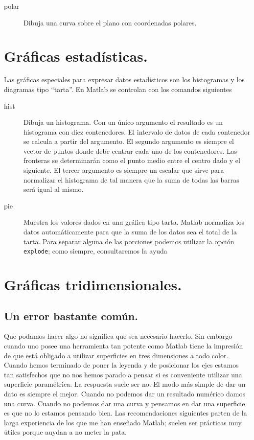 \begin{description}
\item [polar\texttt{}]Dibuja una curva sobre el plano con
coordenadas polares.
\end{description}

\section{Gráficas estadísticas.}

Las gráficas especiales para expresar datos estadísticos son los histogramas
y los diagramas tipo {}``tarta''. En Matlab se controlan con los
comandos siguientes

\begin{description}
\item [hist\texttt{}]Dibuja un histograma. Con un único argumento
el resultado es un histograma con diez contenedores. El intervalo
de datos de cada contenedor se calcula a partir del argumento. El
segundo argumento es siempre el vector de puntos donde debe centrar
cada uno de los contenedores. Las fronteras se determinarán como el
punto medio entre el centro dado y el siguiente. El tercer argumento
es siempre un escalar que sirve para normalizar el histograma de tal
manera que la suma de todas las barras será igual al mismo.
\item [pie\texttt{}]Muestra los valores dados en una gráfica
tipo tarta. Matlab normaliza los datos automáticamente para que la
suma de los datos sea el total de la tarta. Para separar alguna de
las porciones podemos utilizar la opción \texttt{explode}; como siempre,
consultaremos la ayuda
\end{description}

\section{Gráficas tridimensionales.}


\subsection{Un error bastante común.}

Que podamos hacer algo no significa que sea necesario hacerlo. Sin
embargo cuando uno posee una herramienta tan potente como Matlab tiene
la impresión de que está obligado a utilizar superficies en tres dimensiones
a todo color. Cuando hemos terminado de poner la leyenda y de posicionar
los ejes estamos tan satisfechos que no nos hemos parado a pensar
si es conveniente utilizar una superficie paramétrica. La respuesta
suele ser no. El modo más simple de dar un dato es siempre el mejor.
Cuando no podemos dar un resultado numérico damos una curva. Cuando
no podemos dar una curva y pensamos en dar una superficie es que no
lo estamos pensando bien. Las recomendaciones siguientes parten de
la larga experiencia de los que me han enseñado Matlab; suelen ser
prácticas muy útiles porque auydan a no meter la pata.

